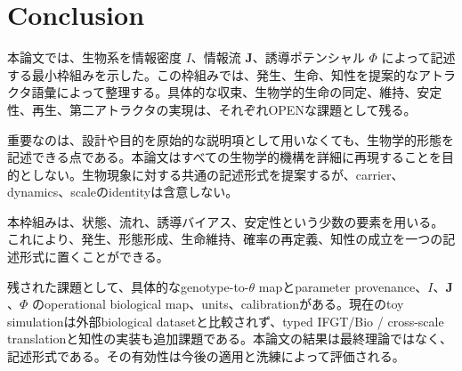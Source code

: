 \documentclass[11pt]{ltjsarticle}
\newcommand{\I}{I}
\newcommand{\J}{\mathbf{J}}
\newcommand{\PhiI}{\Phi}
\begin{document}
\section{Conclusion}

本論文では、生物系を情報密度 \(\I\)、情報流 \(\J\)、誘導ポテンシャル \(\PhiI\) によって記述する最小枠組みを示した。この枠組みでは、発生、生命、知性を提案的なアトラクタ語彙によって整理する。具体的な収束、生物学的生命の同定、維持、安定性、再生、第二アトラクタの実現は、それぞれOPENな課題として残る。

重要なのは、設計や目的を原始的な説明項として用いなくても、生物学的形態を記述できる点である。本論文はすべての生物学的機構を詳細に再現することを目的としない。生物現象に対する共通の記述形式を提案するが、carrier、dynamics、scaleのidentityは含意しない。

本枠組みは、状態、流れ、誘導バイアス、安定性という少数の要素を用いる。これにより、発生、形態形成、生命維持、確率の再定義、知性の成立を一つの記述形式に置くことができる。

残された課題として、具体的なgenotype-to-\(\theta\) mapとparameter provenance、\(\I\)、\(\J\)、\(\PhiI\) のoperational biological map、units、calibrationがある。現在のtoy simulationは外部biological datasetと比較されず、typed IFGT/Bio / cross-scale translationと知性の実装も追加課題である。本論文の結果は最終理論ではなく、記述形式である。その有効性は今後の適用と洗練によって評価される。
\end{document}

